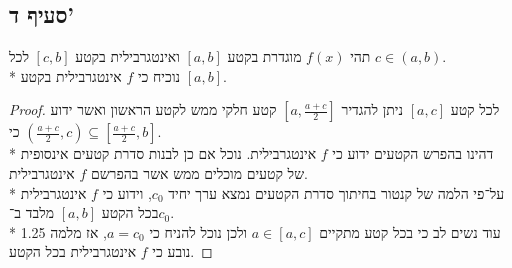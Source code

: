 \subsection{סעיף ד'}
תהי $f(x)$ מוגדרת בקטע $[a, b]$ ואינטגרבילית בקטע $[c, b]$ לכל $c \in (a, b)$. \\*
נוכיח כי $f$ אינטגרבילית בקטע $[a, b]$.
\begin{proof}
	לכל קטע $[a, c]$ ניתן להגדיר $[a, \frac{a + c}{2}]$ קטע חלקי ממש לקטע הראשון ואשר ידוע כי $(\frac{a + c}{2}, c) \subseteq [\frac{a + c}{2}, b]$. \\*
	דהינו בהפרש הקטעים ידוע כי $f$ אינטגרבילית. נוכל אם כן לבנות סדרת קטעים אינסופית של קטעים מוכלים ממש אשר בהפרשם $f$ אינטגרבילית. \\*
	על־פי הלמה של קנטור בחיתוך סדרת הקטעים נמצא ערך יחיד $c_0$, וידוע כי $f$ אינטגרבילית בכל הקטע $[a, b]$ מלבד ב־$c_0$. \\*
	עוד נשים לב כי בכל קטע מתקיים $a \in [a, c]$ ולכן נוכל להניח כי $a = c_0$, אז מלמה 1.25 נובע כי $f$ אינטגרבילית בכל הקטע.
\end{proof}

